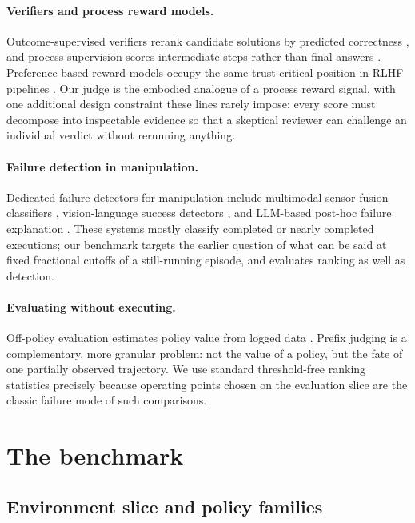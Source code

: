 \documentclass[11pt]{article}
\begin{document}
\paragraph{Verifiers and process reward models.}
Outcome-supervised verifiers rerank candidate solutions by predicted correctness
\citep{cobbe2021verifiers}, and process supervision scores intermediate steps rather than
final answers \citep{uesato2022process, lightman2024verify}. Preference-based reward models
occupy the same trust-critical position in RLHF pipelines \citep{christiano2017preferences}.
Our judge is the embodied analogue of a process reward signal, with one additional design
constraint these lines rarely impose: every score must decompose into inspectable evidence
so that a skeptical reviewer can challenge an individual verdict without rerunning anything.

\paragraph{Failure detection in manipulation.}
Dedicated failure detectors for manipulation include multimodal sensor-fusion classifiers
\citep{inceoglu2021finonet}, vision-language success detectors \citep{du2023vlmsuccess}, and
LLM-based post-hoc failure explanation \citep{liu2023reflect}. These systems mostly classify
completed or nearly completed executions; our benchmark targets the earlier question of what
can be said at fixed fractional cutoffs of a still-running episode, and evaluates ranking as
well as detection.

\paragraph{Evaluating without executing.}
Off-policy evaluation estimates policy value from logged data \citep{thomas2016hcope,
levine2020offline}. Prefix judging is a complementary, more granular problem: not the value
of a policy, but the fate of one partially observed trajectory. We use standard
threshold-free ranking statistics precisely because operating points chosen on the evaluation
slice are the classic failure mode of such comparisons.

\section{The benchmark}
\label{sec:benchmark}

\subsection{Environment slice and policy families}
\end{document}
